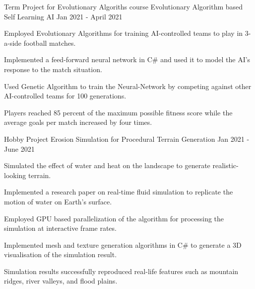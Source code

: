 

\begin{cventries}

  \cventry
    {Term Project for Evolutionary Algoriths course} %
    {Evolutionary Algorithm based Self Learning AI} %
    {Jan 2021 - April 2021} %
    {} %
    {
      \begin{cvitems} %
        \item {Employed Evolutionary Algorithms for training AI-controlled teams to play in 3-a-side football matches.}
        \item {Implemented a feed-forward neural network in C# and used it to model the AI's response to the match situation.}
        \item {Used Genetic Algorithm to train the Neural-Network by competing against other AI-controlled teams for 100 generations.}
        \item {Players reached 85 percent of the maximum possible fitness score while the average goals per match increased by four times.}
      \end{cvitems}
    }

  \cventry
    {Hobby Project} %
    {Erosion Simulation for Procedural Terrain Generation} %
    {Jan 2021 - June 2021} %
    {} %
    {
      \begin{cvitems} %
        \item {Simulated the effect of water and heat on the landscape to generate realistic-looking terrain.}
        \item {Implemented a research paper on real-time fluid simulation to replicate the motion of water on Earth's surface.}
        \item {Employed GPU based parallelization of the algorithm for processing the simulation at interactive frame rates.}
        \item {Implemented mesh and texture generation algorithms in C# to generate a 3D visualisation of the simulation result.}
        \item {Simulation results successfully reproduced real-life features such as mountain ridges, river valleys, and flood plains.}
      \end{cvitems}
    }
    

\end{cventries}
